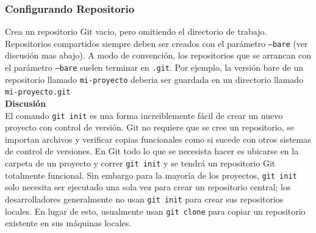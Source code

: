 \documentclass[8pt]{beamer}
\begin{document}
\begin{frame}
\frametitle{Configurando Repositorio}


Crea un repositorio Git vacio, pero omitiendo el directorio de trabajo. Repositorios compartidos siempre deben ser creados con el par\'ametro \texttt{--bare} (ver discusi\'on mas abajo). A modo de convenci\'on, los repositorios que se arrancan con el par\'ametro \texttt{--bare} suelen terminar en \texttt{.git}. Por ejemplo, la versi\'on bare de un repositorio llamado \texttt{mi-proyecto} deberia ser guardada en un directorio llamado \texttt{mi-proyecto.git}\\
\medskip
\textbf{Discusi\'on}\\
El comando \texttt{git init} es una forma increiblemente f\'acil de crear un nuevo proyecto con control de versi\'on. Git no requiere que se cree un repositorio, se importan archivos y verificar copias funcionales como si sucede con otros sistemas de control de versiones. En Git todo lo que se necesista hacer es ubicarse en la carpeta de un proyecto y correr \texttt{git init} y se tendr\'a un repositorio Git totalmente funcional. Sin embargo para la mayor\'ia de los proyectos, \texttt{git init} solo necesita ser ejecutado una sola vez para crear un repositorio central; los desarrolladores generalmente no usan \texttt{git init} para crear sus repositorios locales. En lugar de esto, usualmente usan \texttt{git clone} para copiar un repositorio existente en sus m\'aquinas locales.  

\end{frame}
\end{document}
